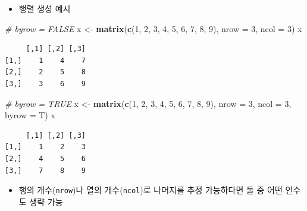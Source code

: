 \documentclass[
  11pt,
]{krantz}
\newenvironment{Shaded}{\begin{snugshade}}{\end{snugshade}}
\newcommand{\CommentTok}[1]{\textcolor[rgb]{0.37,0.37,0.37}{\textit{#1}}}
\newcommand{\DataTypeTok}[1]{\textcolor[rgb]{0.27,0.27,0.27}{#1}}
\newcommand{\DecValTok}[1]{\textcolor[rgb]{0.06,0.06,0.06}{#1}}
\newcommand{\KeywordTok}[1]{\textcolor[rgb]{0.27,0.27,0.27}{\textbf{#1}}}
\newcommand{\NormalTok}[1]{#1}
\newcommand{\StringTok}[1]{\textcolor[rgb]{0.5,0.5,0.5}{#1}}
\providecommand{\tightlist}{%
  \setlength{\itemsep}{0pt}\setlength{\parskip}{0pt}}
\begin{document}
\normalsize

\begin{itemize}
\tightlist
\item
  행렬 생성 예시
\end{itemize}

\footnotesize

\begin{Shaded}
\begin{Highlighting}[]
\CommentTok{# byrow = FALSE}
\NormalTok{x <-}\StringTok{ }\KeywordTok{matrix}\NormalTok{(}\KeywordTok{c}\NormalTok{(}\DecValTok{1}\NormalTok{, }\DecValTok{2}\NormalTok{, }\DecValTok{3}\NormalTok{, }\DecValTok{4}\NormalTok{, }\DecValTok{5}\NormalTok{, }\DecValTok{6}\NormalTok{, }\DecValTok{7}\NormalTok{, }\DecValTok{8}\NormalTok{, }\DecValTok{9}\NormalTok{), }\DataTypeTok{nrow =} \DecValTok{3}\NormalTok{, }\DataTypeTok{ncol =} \DecValTok{3}\NormalTok{)}
\NormalTok{x}
\end{Highlighting}
\end{Shaded}

\begin{verbatim}
     [,1] [,2] [,3]
[1,]    1    4    7
[2,]    2    5    8
[3,]    3    6    9
\end{verbatim}

\begin{Shaded}
\begin{Highlighting}[]
\CommentTok{# byrow = TRUE}
\NormalTok{x <-}\StringTok{ }\KeywordTok{matrix}\NormalTok{(}\KeywordTok{c}\NormalTok{(}\DecValTok{1}\NormalTok{, }\DecValTok{2}\NormalTok{, }\DecValTok{3}\NormalTok{, }\DecValTok{4}\NormalTok{, }\DecValTok{5}\NormalTok{, }\DecValTok{6}\NormalTok{, }\DecValTok{7}\NormalTok{, }\DecValTok{8}\NormalTok{, }\DecValTok{9}\NormalTok{), }\DataTypeTok{nrow =} \DecValTok{3}\NormalTok{, }\DataTypeTok{ncol =} \DecValTok{3}\NormalTok{, }\DataTypeTok{byrow =}\NormalTok{ T)}
\NormalTok{x}
\end{Highlighting}
\end{Shaded}

\begin{verbatim}
     [,1] [,2] [,3]
[1,]    1    2    3
[2,]    4    5    6
[3,]    7    8    9
\end{verbatim}

\normalsize

\begin{itemize}
\tightlist
\item
  행의 개수(\texttt{nrow})나 열의 개수(\texttt{ncol})로 나머지를 추정 가능하다면 둘 중 어떤 인수도 생략 가능
\end{itemize}
\end{document}
